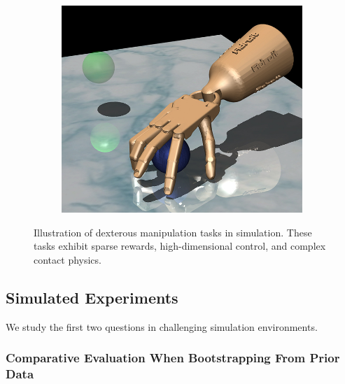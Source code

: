 \documentclass[conference]{IEEEtran}
\begin{document}
\begin{figure}[tpb]
\begin{subfigure}[b]{0.3\textwidth}
        \center
        \includegraphics[height=0.8\linewidth]{figures/imgs/relocate.jpg}
    \end{subfigure}
    \caption{Illustration of dexterous manipulation tasks in simulation. These tasks exhibit sparse rewards, high-dimensional control, and complex contact physics. }
\end{figure}

\subsection{Simulated Experiments}
We study the first two questions in challenging simulation  environments. 

\subsubsection{Comparative Evaluation When Bootstrapping From Prior Data} \label{sec:dextrous_exps}
\end{document}
